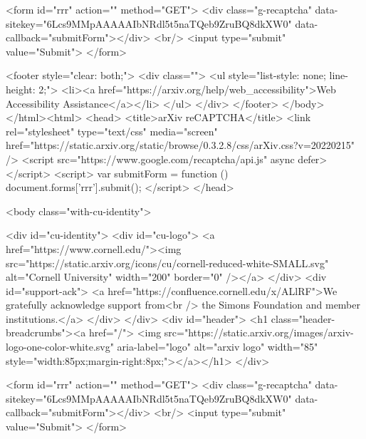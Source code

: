        <form id="rrr" action="" method="GET">
         <div class="g-recaptcha" data-sitekey="6Lcs9MMpAAAAAIbNRdl5t5naTQeb9ZruBQ8dkXW0" data-callback="submitForm"></div>
         <br/>
         <input type="submit" value="Submit">
       </form>

       <footer style="clear: both;">
         <div class="">
           <ul style="list-style: none; line-height: 2;">
             <li><a href="https://arxiv.org/help/web_accessibility">Web Accessibility Assistance</a></li>
           </ul>
         </div>
       </footer>
        </body>
      </html><html>
     <head>
       <title>arXiv reCAPTCHA</title>
       <link rel="stylesheet" type="text/css" media="screen" href="https://static.arxiv.org/static/browse/0.3.2.8/css/arXiv.css?v=20220215" />
       <script src="https://www.google.com/recaptcha/api.js" async defer></script>
       <script>
         var submitForm = function () {
             document.forms['rrr'].submit();
         }
       </script>
     </head>

     <body class="with-cu-identity">

       <div id="cu-identity">
         <div id="cu-logo">
           <a href="https://www.cornell.edu/"><img src="https://static.arxiv.org/icons/cu/cornell-reduced-white-SMALL.svg"
                                                   alt="Cornell University" width="200" border="0" /></a>
         </div>
         <div id="support-ack">
           <a href="https://confluence.cornell.edu/x/ALlRF">We gratefully acknowledge support from<br />
             the Simons Foundation and member institutions.</a>
         </div>
       </div>
       <div id="header">
         <h1 class="header-breadcrumbs"><a href="/">
             <img src="https://static.arxiv.org/images/arxiv-logo-one-color-white.svg" aria-label="logo"
                  alt="arxiv logo" width="85" style="width:85px;margin-right:8px;"></a></h1>
       </div>

       <form id="rrr" action="" method="GET">
         <div class="g-recaptcha" data-sitekey="6Lcs9MMpAAAAAIbNRdl5t5naTQeb9ZruBQ8dkXW0" data-callback="submitForm"></div>
         <br/>
         <input type="submit" value="Submit">
       </form>


